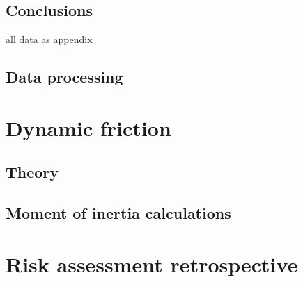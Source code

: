 \documentclass[12pt]{article}
\begin{document}
\subsection{Conclusions}





all data as appendix 

\subsection{Data processing}



\section{Dynamic friction}

\subsection{Theory}

\subsection{Moment of inertia calculations}







\section{Risk assessment retrospective}

\printbibliography
\end{document}

